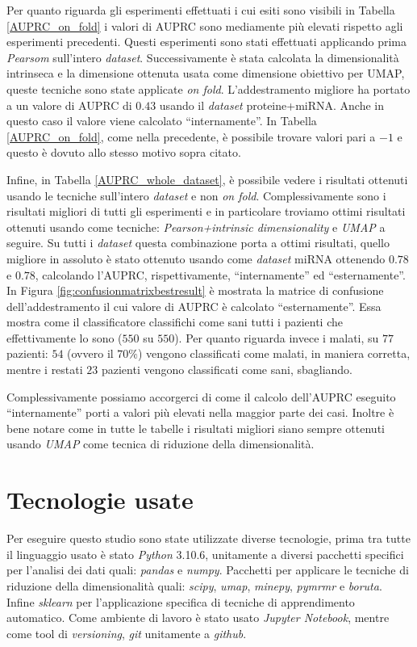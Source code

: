 \documentclass[12pt,italian]{report}
\begin{document}
	Per quanto riguarda gli esperimenti effettuati i cui esiti sono visibili in Tabella \ref{AUPRC_on_fold} i valori di AUPRC sono mediamente più elevati rispetto agli esperimenti precedenti. Questi esperimenti sono stati effettuati applicando prima \textit{Pearsom} sull'intero \textit{dataset}. Successivamente è stata calcolata la dimensionalità intrinseca e la dimensione ottenuta usata come dimensione obiettivo per UMAP, queste tecniche sono state applicate \textit{on fold}. L'addestramento migliore ha portato a un valore di AUPRC di $0.43$ usando il \textit{dataset} proteine+miRNA. Anche in questo caso il valore viene calcolato ``internamente''.
	In Tabella \ref{AUPRC_on_fold}, come nella precedente, è possibile trovare valori pari a $-1$ e questo è dovuto allo stesso motivo sopra citato.
	
	Infine, in Tabella \ref{AUPRC_whole_dataset}, è possibile vedere i risultati ottenuti usando le tecniche sull'intero \textit{dataset} e non \textit{on fold}. Complessivamente sono i risultati migliori di tutti gli esperimenti e in particolare troviamo ottimi risultati ottenuti usando come tecniche: \textit{Pearson+intrinsic dimensionality} e \textit{UMAP} a seguire. Su tutti i \textit{dataset} questa combinazione porta a ottimi risultati, quello migliore in assoluto è stato ottenuto usando come \textit{dataset} miRNA ottenendo $0.78$ e $0.78$, calcolando l'AUPRC, rispettivamente, ``internamente'' ed ``esternamente''.
	In Figura \ref{fig:confusionmatrixbestresult} è mostrata la matrice di confusione dell'addestramento il cui valore di AUPRC è calcolato ``esternamente''. Essa mostra come il classificatore classifichi come sani tutti i pazienti che effettivamente lo sono ($550$ su $550$). Per quanto riguarda invece i malati, su $77$ pazienti: $54$ (ovvero il $70\%$) vengono classificati come malati, in maniera corretta, mentre i restati $23$ pazienti vengono classificati come sani, sbagliando.
	
	
	Complessivamente possiamo accorgerci di come il calcolo dell'AUPRC eseguito ``internamente'' porti a valori più elevati nella maggior parte dei casi. Inoltre è bene notare come in tutte le tabelle i risultati migliori siano sempre ottenuti usando \textit{UMAP} come tecnica di riduzione della dimensionalità.
	
	\section{Tecnologie usate}
	Per eseguire questo studio sono state utilizzate diverse tecnologie, prima tra tutte il linguaggio usato è stato \textit{Python} 3.10.6, unitamente a diversi pacchetti specifici per l'analisi dei dati quali: \textit{pandas} e \textit{numpy}. Pacchetti per applicare le tecniche di riduzione della dimensionalità quali: \textit{scipy}, \textit{umap}, \textit{minepy}, \textit{pymrmr} e \textit{boruta}. Infine \textit{sklearn} per l'applicazione specifica di tecniche di apprendimento automatico.
	Come ambiente di lavoro è stato usato \textit{Jupyter Notebook}, mentre come tool di \textit{versioning}, \textit{git} unitamente a \textit{github}. 
	
\end{document}
